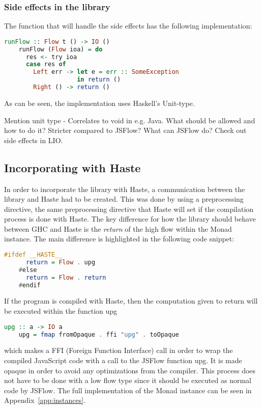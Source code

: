 \subsubsection{Side effects in the library}
The function that will handle the side effects has the following implementation:
\begin{center}
  \begin{lstlisting}[language=Haskell]
    runFlow :: Flow t () -> IO ()
    runFlow (Flow ioa) = do
      res <- try ioa
      case res of
        Left err -> let e = err :: SomeException
                    in return ()
        Right () -> return ()
  \end{lstlisting}
\end{center}
As can be seen, the implementation uses Haskell's Unit-type.

Mention unit type - Correlates to void in e.g. Java.
What should be allowed and how to do it?
Stricter compared to JSFlow?
What can JSFlow do?
Check out side effects in LIO.

\subsection{Incorporating with Haste}
In order to incorporate the library with Haste, a communication between the library and Haste had to be created. This was done by using a preprocessing directive, the same preprocessing directive that Haste will set if the compilation process is done with Haste. The key difference for how the library should behave between GHC and Haste is the \emph{return} of the high flow within the Monad instance. The main difference is highlighted in the following code snippet:
\begin{center}
  \begin{lstlisting}[language=Haskell]
    #ifdef __HASTE__
      return = Flow . upg
    #else
      return = Flow . return
    #endif
  \end{lstlisting}
\end{center}
If the program is compiled with Haste, then the computation given to return will be executed within the function upg
\begin{center}
  \begin{lstlisting}[language=Haskell]
    upg :: a -> IO a
    upg = fmap fromOpaque . ffi "upg" . toOpaque
  \end{lstlisting}
\end{center}
which makes a FFI (Foreign Function Interface) call in order to wrap the compiled JavaScript code with a call to the JSFlow function upg. It is made opaque in order to avoid any optimizations from the compiler. This process does not have to be done with a low flow type since it should be executed as normal code by JSFlow. The full implementation of the Monad instance can be seen in Appendix~\ref{app:instances}.
